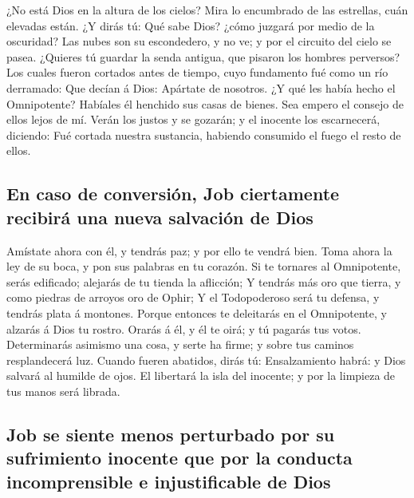  ¿No está Dios en la altura de los cielos? Mira lo
encumbrado de las estrellas, cuán elevadas están.  ¿Y
dirás tú: Qué sabe Dios? ¿cómo juzgará por medio de la oscuridad?
 Las nubes son su escondedero, y no ve; y por el circuito
del cielo se pasea.  ¿Quieres tú guardar la senda
antigua, que pisaron los hombres perversos?  Los cuales
fueron cortados antes de tiempo, cuyo fundamento fué como un río
derramado:  Que decían á Dios: Apártate de nosotros. ¿Y
qué les había hecho el Omnipotente?  Habíales él henchido
sus casas de bienes. Sea empero el consejo de ellos lejos de mí.
 Verán los justos y se gozarán; y el inocente los
escarnecerá, diciendo:  Fué cortada nuestra sustancia,
habiendo consumido el fuego el resto de ellos.

\hypertarget{en-caso-de-conversiuxf3n-job-ciertamente-recibiruxe1-una-nueva-salvaciuxf3n-de-dios}{%
\subsection{En caso de conversión, Job ciertamente recibirá una nueva
salvación de
Dios}\label{en-caso-de-conversiuxf3n-job-ciertamente-recibiruxe1-una-nueva-salvaciuxf3n-de-dios}}

 Amístate ahora con él, y tendrás paz; y por ello te
vendrá bien.  Toma ahora la ley de su boca, y pon sus
palabras en tu corazón.  Si te tornares al Omnipotente,
serás edificado; alejarás de tu tienda la aflicción;  Y
tendrás más oro que tierra, y como piedras de arroyos oro de Ophir;
 Y el Todopoderoso será tu defensa, y tendrás plata á
montones.  Porque entonces te deleitarás en el
Omnipotente, y alzarás á Dios tu rostro.  Orarás á él, y
él te oirá; y tú pagarás tus votos.  Determinarás
asimismo una cosa, y serte ha firme; y sobre tus caminos resplandecerá
luz.  Cuando fueren abatidos, dirás tú: Ensalzamiento
habrá: y Dios salvará al humilde de ojos.  El libertará
la isla del inocente; y por la limpieza de tus manos será librada.

\hypertarget{job-se-siente-menos-perturbado-por-su-sufrimiento-inocente-que-por-la-conducta-incomprensible-e-injustificable-de-dios}{%
\subsection{Job se siente menos perturbado por su sufrimiento inocente
que por la conducta incomprensible e injustificable de
Dios}\label{job-se-siente-menos-perturbado-por-su-sufrimiento-inocente-que-por-la-conducta-incomprensible-e-injustificable-de-dios}}

